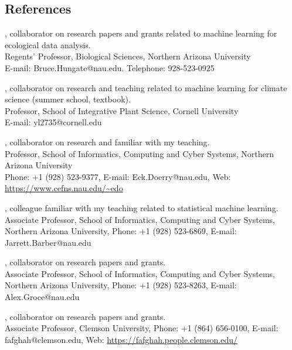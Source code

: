 \documentclass[margin,line]{res}
\begin{document}
\begin{resume}

\section{\sc References}
 
, collaborator on research papers and grants related to machine learning for ecological data analysis. \\
Regents' Professor, Biological Sciences, Northern Arizona University\\
E-mail: Bruce.Hungate@nau.edu. Telephone: 928-523-0925

, collaborator on research and teaching related to machine learning for climate science (summer school, textbook).\\
Professor, School of Integrative Plant Science, Cornell University\\
E-mail: yl2735@cornell.edu

, collaborator on research and familiar with my teaching.\\
Professor, School of Informatics, Computing and Cyber Systems, Northern Arizona University\\
Phone: +1 (928) 523-9377, E-mail: Eck.Doerry@nau.edu, Web: \url{https://www.cefns.nau.edu/~edo}

, colleague familiar with my teaching related to statistical machine learning.\\
Associate Professor, School of Informatics, Computing and Cyber Systems,\\
Northern Arizona University, 
Phone: +1 (928) 523-6869, E-mail: Jarrett.Barber@nau.edu

, collaborator on research papers and grants.\\
Associate Professor, School of Informatics, Computing and Cyber Systems,\\
Northern Arizona University, 
Phone: +1 (928) 523-8263, E-mail: Alex.Groce@nau.edu

, collaborator on research papers and grants.\\
Associate Professor, Clemson University, Phone: +1 (864) 656-0100, E-mail: fafghah@clemson.edu, Web: \url{https://fafghah.people.clemson.edu/}


\end{resume}
\end{document}
